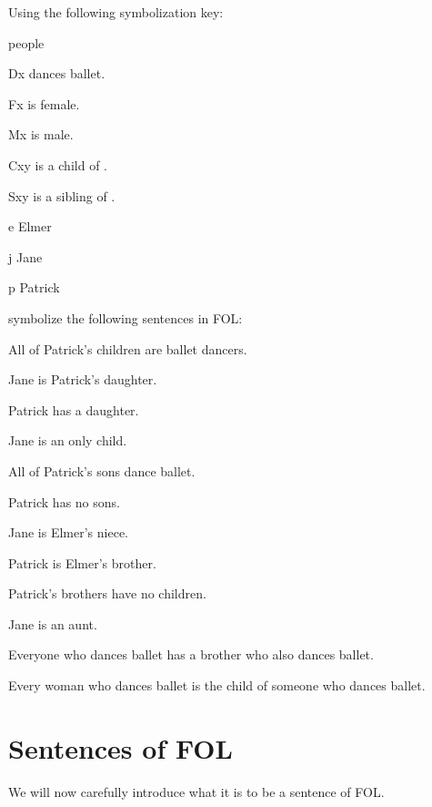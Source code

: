 \solutions
\problempart
\label{pr.FOLballet}
Using the following symbolization key:
\begin{ekey}
\item[\text{domain}] people
\item[Dx]  dances ballet.
\item[Fx]  is female.
\item[Mx]  is male.
\item[Cxy]  is a child of .
\item[Sxy]  is a sibling of .
\item[e] Elmer
\item[j] Jane
\item[p] Patrick
\end{ekey}
symbolize the following sentences in FOL:
\begin{earg}
\item All of Patrick's children are ballet dancers.
\item Jane is Patrick's daughter.
\item Patrick has a daughter.
\item Jane is an only child.
\item All of Patrick's sons dance ballet.
\item Patrick has no sons.
\item Jane is Elmer's niece.
\item Patrick is Elmer's brother.
\item Patrick's brothers have no children.
\item Jane is an aunt.
\item Everyone who dances ballet has a brother who also dances ballet.
\item Every woman who dances ballet is the child of someone who dances ballet.
\end{earg}






\chapter{Sentences of FOL}\label{s:FOLSentences}
We will now carefully introduce what it is to be a sentence of FOL. 

